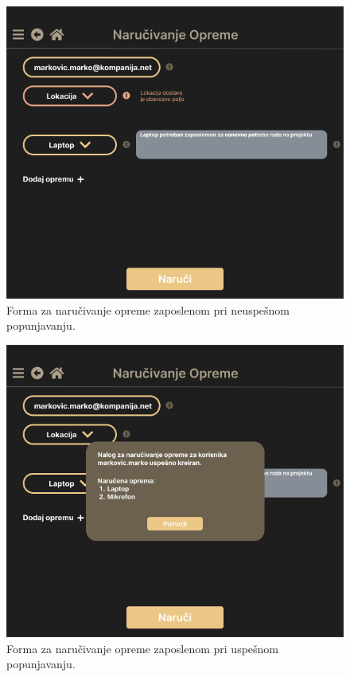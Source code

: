 \documentclass[a4paper]{article}
\begin{document}
\begin{figure} [!ht]
    \begin{center}
        \includegraphics[scale=0.33]{UI/Administrator/Administrator_NarucivanjeOpreme_ObaveznoPolje.png}
    \end{center}
\caption{Forma za naručivanje opreme zaposlenom pri neuspešnom popunjavanju.}
\end{figure}

\begin{figure} [!ht]
    \begin{center}
        \includegraphics[scale=0.33]{UI/Administrator/Administrator_NarucivanjeOpreme_Uspesno.png}
    \end{center}
\caption{Forma za naručivanje opreme zaposlenom pri uspešnom popunjavanju.}
\end{figure}
\end{document}
